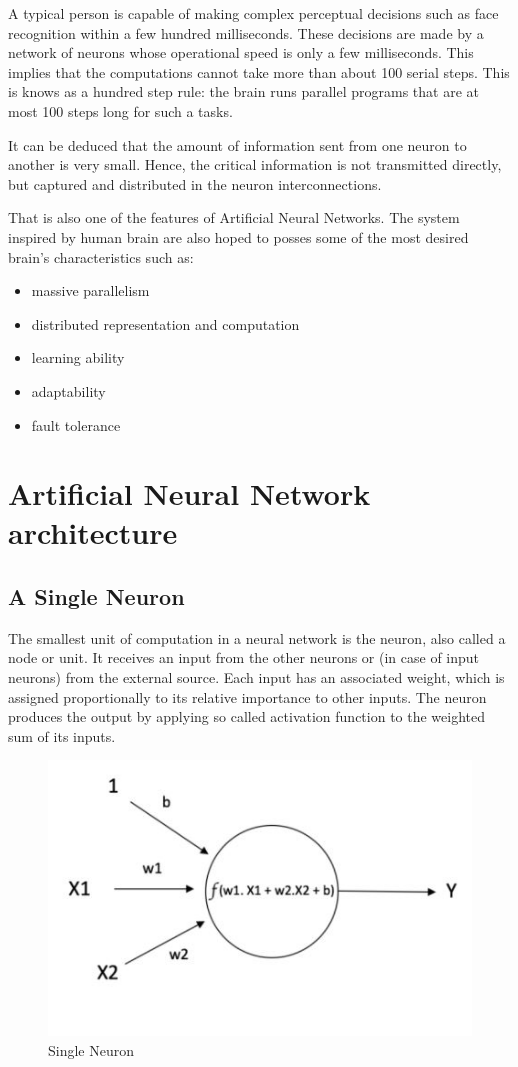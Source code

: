A typical person is capable of making complex perceptual decisions such as face recognition within a few hundred milliseconds. These decisions are made by a network of neurons whose operational speed is only a few milliseconds. This implies that the computations cannot take more than about 100 serial steps. This is knows as a hundred step rule: the brain runs parallel programs that are at most 100 steps long for such a tasks.

It can be deduced that the amount of information sent from one neuron to another is very small. Hence, the critical information is not transmitted directly, but captured and distributed in the neuron interconnections. 

That is also one of the features of Artificial Neural Networks. The system inspired by human brain are also hoped to posses some of the most desired brain's characteristics such as:

\begin{itemize}
\itemsep0em 
\item massive parallelism 
\item distributed representation and computation
\item learning ability 
\item adaptability
\item fault tolerance
\end{itemize}


\section{Artificial Neural Network architecture}

\subsection{A Single Neuron}

The smallest unit of computation in a neural network is the neuron, also called a node or unit. It receives an input from the other neurons or (in case of input neurons) from the external source. Each input has an associated weight, which is assigned proportionally to its relative importance to other inputs. The neuron produces the output by applying so called activation function to the weighted sum of its inputs.

\begin{figure}[H]
\centering
\includegraphics[scale=0.65]{single_neuron.jpg}
\caption{Single Neuron}
\end{figure} 

